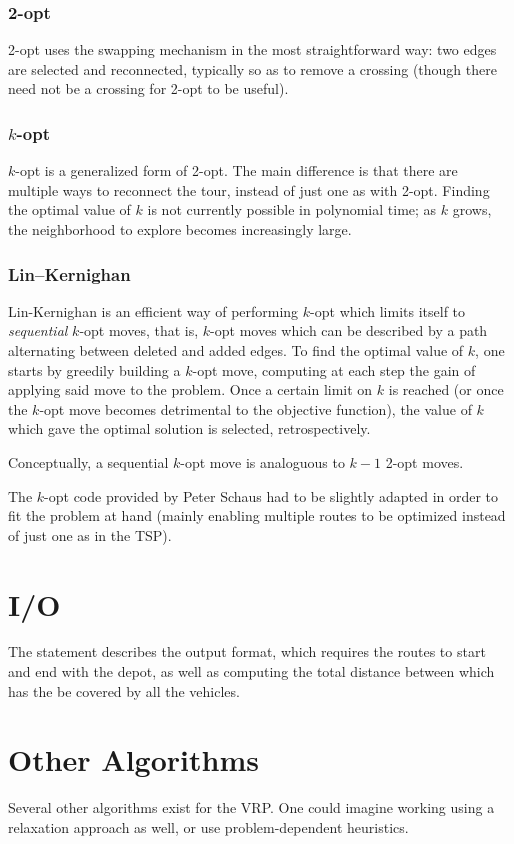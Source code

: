 \documentclass[journal]{IEEEtran}
\begin{document}
\subsubsection{2-opt}
2-opt uses the swapping mechanism in the most straightforward way: two edges are selected and reconnected, typically so as to remove a crossing (though there need not be a crossing for 2-opt to be useful).

\subsubsection{\(k\)-opt}
\(k\)-opt is a generalized form of 2-opt.
The main difference is that there are multiple ways to reconnect the tour, instead of just one as with 2-opt.
Finding the optimal value of \(k\) is not currently possible in polynomial time; as \(k\) grows, the neighborhood to explore becomes increasingly large.

\subsubsection{Lin--Kernighan}
Lin-Kernighan is an efficient way of performing \(k\)-opt which limits itself to \emph{sequential} \(k\)-opt moves, that is, \(k\)-opt moves which can be described by a path alternating between deleted and added edges.
To find the optimal value of \(k\), one starts by greedily building a \(k\)-opt move, computing at each step the gain of applying said move to the problem.
Once a certain limit on \(k\) is reached (or once the \(k\)-opt move becomes detrimental to the objective function), the value of \(k\) which gave the optimal solution is selected, retrospectively.

Conceptually, a sequential \(k\)-opt move is analoguous to \(k-1\) 2-opt moves.

The \(k\)-opt code provided by Peter Schaus had to be slightly adapted in order to fit the problem at hand (mainly enabling multiple routes to be optimized instead of just one as in the TSP).

\section{I/O}
The statement describes the output format, which requires the routes to start and end with the depot, as well as computing the total distance between which has the be covered by all the vehicles.

\section{Other Algorithms}
Several other algorithms exist for the VRP.
One could imagine working using a relaxation approach as well, or use problem-dependent heuristics.
\end{document}
